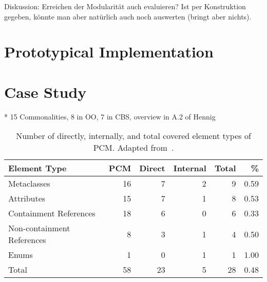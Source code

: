 

Diskussion: Erreichen der Modularität auch evaluieren? Ist per Konstruktion gegeben, könnte man aber natürlich auch noch auswerten (bringt aber nichts).


\section{Prototypical Implementation}

\section{Case Study}

* 15 Commonalities, 8 in OO, 7 in CBS, overview in A.2 of Hennig
\begin{table}[htb]
	\centering
		\begin{tabular}{lrrrrr}
			\toprule
			\multicolumn{1}{l}{\bfseries Element Type} & \multicolumn{1}{r}{\bfseries PCM} & \multicolumn{1}{r}{\bfseries Direct} & \multicolumn{1}{r}{\bfseries Internal} & \multicolumn{1}{r}{\bfseries Total} & \multicolumn{1}{r}{\bfseries \%}\\
			\midrule
			Metaclasses 				& 16 & 7  & 2 		& 9 & 0.59  \\
			Attributes 					& 15 & 7  & 1 		& 8 & 0.53 \\
			Containment References 		& 18 & 6  & 0 		& 6 & 0.33  \\
			Non-containment References 	& 8  & 3  & 1  		& 4 & 0.50  \\
			Enums 						& 1  & 0  & 1  		& 1 & 1.00  \\
			\midrule
			Total 						& 58  & 23  & 5  	& 28 & 0.48  \\
			\bottomrule
		\end{tabular}
	\caption{Number of directly, internally, and total covered element types of PCM. Adapted from~\cite[Table 10.3]{hennig2020ma}.}
	\label{tab:commonalities_evaluation:coverage_pcm}
\end{table}

